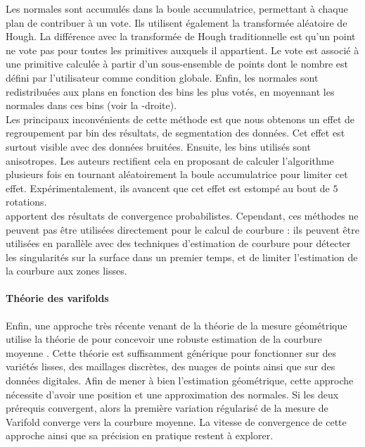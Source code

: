 Les normales sont accumulés dans la boule accumulatrice, permettant à chaque
plan de contribuer à un vote. Ils utilisent également la transformée aléatoire
de Hough. La différence avec la transformée de Hough traditionnelle est qu'un
point ne vote pas pour toutes les primitives auxquels il appartient. Le vote est
associé à une primitive calculée à partir d'un sous-ensemble de points
\cite{Xu1990, Xu1993} dont le nombre est défini par l'utilisateur comme
condition globale. Enfin, les normales sont redistribuées aux plans en fonction
des bins les plus votés, en moyennant les normales dans ces bins (voir la
-droite).
%
\\
%
Les principaux inconvénients de cette méthode est que nous obtenons un effet de
regroupement par bin des résultats, de segmentation des données. Cet effet est
surtout visible avec des données bruitées. Ensuite, les bins utilisés sont
anisotropes. Les auteurs rectifient cela en proposant de calculer l’algorithme
plusieurs fois en tournant aléatoirement la boule accumulatrice pour limiter cet
effet. Expérimentalement, ils avancent que cet effet est estompé au bout de $5$
rotations.
%
\\
%
 apportent des résultats de convergence probabilistes.
Cependant, ces méthodes ne peuvent pas être utilisées directement pour le calcul
de courbure : ils peuvent être utilisées en parallèle avec des techniques
d'estimation de courbure pour détecter les singularités sur la surface dans un
premier temps, et de limiter l'estimation de la courbure aux zones lisses.
%
\paragraph{Théorie des varifolds}
%
Enfin, une approche très récente venant de la théorie de la mesure géométrique
utilise la théorie de  \cite{Almgren1965} pour concevoir une
robuste estimation de la courbure moyenne \cite{Buet2014,Buet2015}. Cette
théorie est suffisamment générique pour fonctionner sur des variétés lisses, des
maillages discrètes, des nuages de points ainsi que sur des données digitales.
Afin de mener à bien l'estimation géométrique, cette approche nécessite d'avoir
une position et une approximation des normales. Si les deux prérequis
convergent, alors la première variation régularisé de la mesure de Varifold
converge vers la courbure moyenne. La vitesse de convergence de cette approche
ainsi que sa précision en pratique restent à explorer.
%
